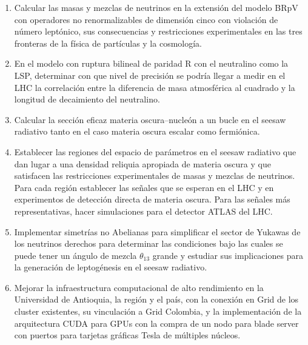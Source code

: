 \begin{enumerate}
\item 
\begin{bbrpvlhc}
  Calcular las masas y mezclas de neutrinos en la extensión del modelo
  BRpV con operadores no renormalizables de dimensión cinco con
  violación de número leptónico, sus consecuencias y restricciones
  experimentales en las tres fronteras de la física de partículas y la
  cosmología.
\end{bbrpvlhc}
\label{item:bbrpvlhc1}
\item 
\begin{brpvlhc}  
  En el modelo con ruptura bilineal de paridad R con el neutralino
  como la LSP, determinar con que nivel de precisión se podría llegar
  a medir en el LHC la correlación entre la diferencia de masa
  atmosférica al cuadrado y la longitud de decaimiento del neutralino.
\end{brpvlhc}
\label{item:bbrpvlhc2}
\item 
\begin{darkmatter}
  Calcular la sección eficaz materia oscura--nucleón a un bucle en el
  seesaw radiativo tanto en el caso materia oscura escalar como
  fermiónica.
\end{darkmatter}

\item 
\begin{darkmatter}
  Establecer las regiones del espacio de parámetros en el seesaw
  radiativo que dan lugar a una densidad reliquia apropiada
  de materia oscura y que satisfacen las restricciones
  experimentales de masas y mezclas de neutrinos. Para cada región
  establecer las señales que se esperan en el LHC y en experimentos de
  detección directa de materia oscura.  Para las señales más
  representativas, hacer simulaciones para el detector ATLAS del LHC.
\end{darkmatter}
\label{item:darkmatter1}

\item 
\begin{darkmatter}
  Implementar simetrías no Abelianas para simplificar el sector de
  Yukawas de los neutrinos derechos para determinar las condiciones
  bajo las cuales se puede tener un ángulo de mezcla $\theta_{13}$
  grande y estudiar sus implicaciones para la generación de
  leptogénesis en el seesaw radiativo.
\end{darkmatter}
\label{item:darkmatter2}

\item Mejorar la infraestructura computacional de alto rendimiento en
  la Universidad de Antioquia, la región y el país, con la conexión en
  Grid de los cluster existentes, su vinculación a Grid Colombia, y la
  implementación de la arquitectura CUDA para GPUs con la compra de un
  nodo para blade server con puertos para tarjetas gráficas Tesla de
  múltiples núcleos.
\label{item:grid}
\end{enumerate}

